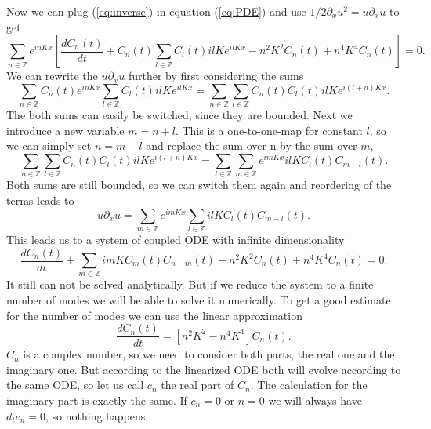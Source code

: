 Now we can plug (\ref{eq:inverse}) in equation (\ref{eq:PDE}) and use $1/2 \partial_x u^2 = u \partial_x u$ to get
\begin{equation}
  \sum_{n \in \mathbb{Z}} e^{in K x} \left[ \frac{d C_n(t)}{dt} + C_n(t) \sum_{l \in \mathbb{Z}} C_l(t) i l K e^{il K x} - n^2 K^2 C_n(t) + n^4 K^4 C_n(t) \right] = 0.
\end{equation}
We can rewrite the $u \partial_x u$ further by first considering the sums
\begin{equation}
  \sum_{n \in \mathbb{Z}} C_n(t)  e^{in K x} \sum_{l \in \mathbb{Z}} C_l(t) i l K e^{il K x} = \sum_{n \in \mathbb{Z}} \sum_{l \in \mathbb{Z}} C_n(t) C_l(t) i l K e^{i (l+n) K x}.
\end{equation}
The both sums can easily be switched, since they are bounded.
Next we introduce a new variable $m = n + l$.
This is a one-to-one-map for constant $l$, so we can simply set $n = m - l$ and replace the sum over n by the sum over $m$,
\begin{equation}
  \sum_{n \in \mathbb{Z}} \sum_{l \in \mathbb{Z}} C_n(t) C_l(t) i l K e^{i (l+n) K x} = \sum_{l \in \mathbb{Z}} \sum_{m \in \mathbb{Z}} e^{i m K x} i l K C_l(t) C_{m - l}(t).
\end{equation}
Both sums are still bounded, so we can switch them again and reordering of the terms leads to
\begin{equation}
  u \partial_x u =  \sum_{m \in \mathbb{Z}} e^{i m K x} \sum_{l \in \mathbb{Z}} i l K C_l(t) C_{m - l}(t).
\end{equation}
This leads us to a system of coupled ODE with infinite dimensionality
\begin{equation}
  \frac{d C_n(t)}{dt} + \sum_{m \in \mathbb{Z}} i m K C_m(t) C_{n - m}(t) -
  n^2 K^2 C_n(t) + n^4 K^4 C_n(t) = 0.
\end{equation}
It still can not be solved analytically.
But if we reduce the system to a finite number of modes we will be able to solve it numerically.
To get a good estimate for the number of modes we can use the linear approximation
\begin{equation}
  \frac{d C_n(t)}{dt} = \left[ n^2 K^2 - n^4 K^4 \right] C_n(t).
\end{equation}
$C_n$ is a complex number, so we need to consider both parts, the real one and the imaginary one.
But according to the linearized ODE both will evolve according to the same ODE, so let us call $c_n$ the real part of $C_n$.
The calculation for the imaginary part is exactly the same.
If $c_n = 0$ or $n = 0$ we will always have $d_t c_n = 0$, so nothing happens.

